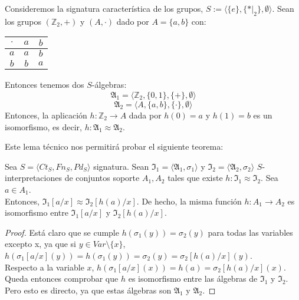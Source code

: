 \begin{example}
Consideremos la signatura característica de los grupos, $S := \langle \{e\}, \{*|_2\}, \emptyset \rangle$. Sean los grupos $(\mathbb{Z}_2, +)$ y $(A, \cdot)$ dado por $A = \{a, b\}$ con:
\begin{table}[H]
    \begin{center}
    \begin{tabular}{|c|c|c|}
    \hline 
    $\cdot$ & $a$ & $b$ \\ \hline
    $a$ & $a$ & $b$\\ \hline
    $b$ & $b$ & $a$\\ \hline
    \end{tabular}
    \end{center}
    \end{table}
\end{example}
Entonces tenemos dos $S$-álgebras:
$$\mathfrak{A}_1 = \langle \mathbb{Z}_2, \{ 0,1\}, \{ +\}, \emptyset \rangle$$
$$\mathfrak{A}_2 = \langle A, \{a,b\}, \{\cdot \}, \emptyset \rangle$$
Entonces, la aplicación $h: \mathbb{Z}_2 \rightarrow A$ dada por $h(0) = a$ y $h(1) = b$ es un isomorfismo, es decir, $h:\mathfrak{A}_1 \approx \mathfrak{A}_2$. 

Este lema técnico nos permitirá probar el siguiente teorema:

\begin{lema}\label{sustiso}
Sea $S = \langle Ct_{S}, Fn_{S}, Pd_{S}\rangle$ signatura. Sean $\mathfrak{I}_1 = \langle \mathfrak{A}_1, \sigma_1 \rangle$ y $\mathfrak{I}_2 = \langle \mathfrak{A}_2, \sigma_2 \rangle$ $S$-interpretaciones de conjuntos soporte $A_1,A_2$ tales que existe $h: \mathfrak{I}_1 \approx \mathfrak{I}_2$. Sea $a\in A_1$.\\
Entonces, $\mathfrak{I}_1[a/x]\approx\mathfrak{I}_2[h(a)/x]$. De hecho, la misma función $h:A_1\to A_2$ es isomorfismo entre $\mathfrak{I}_1[a/x]$ y $\mathfrak{I}_2[h(a)/x]$.
\end{lema}
\begin{proof}
Está claro que se cumple $h(\sigma_1(y)) = \sigma_2(y)$ para todas las variables excepto x, ya que si $y\in Var\setminus \{x\}$, $h(\sigma_1[a/x](y))=h(\sigma_1(y))=\sigma_2(y)=\sigma_2[h(a)/x](y)$.\\
Respecto a la variable $x$, $h(\sigma_1[a/x](x))=h(a)=\sigma_2[h(a)/x](x)$.\\
Queda entonces comprobar que $h$ es isomorfismo entre las álgebras de $\mathfrak{I}_1$ y $\mathfrak{I}_2$. Pero esto es directo, ya que estas álgebras son $\mathfrak{A}_1$ y $\mathfrak{A}_2$.
\end{proof}

